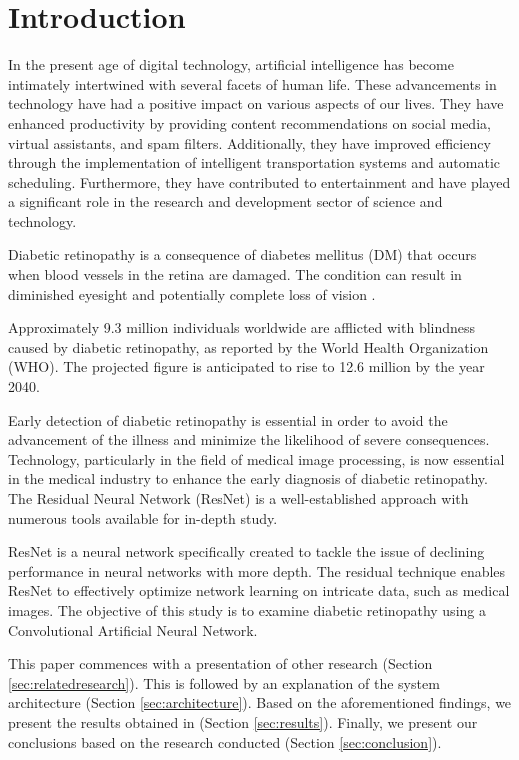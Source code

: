 \section{Introduction}
\label{sec:pendahuluan}


In the present age of digital technology, artificial intelligence has become intimately intertwined with several facets of human life. These advancements in technology have had a positive impact on various aspects of our lives. They have enhanced productivity by providing content recommendations on social media, virtual assistants, and spam filters. Additionally, they have improved efficiency through the implementation of intelligent transportation systems and automatic scheduling. Furthermore, they have contributed to entertainment and have played a significant role in the research and development sector of science and technology.
 
Diabetic retinopathy is a consequence of diabetes mellitus (DM) that occurs when blood vessels in the retina are damaged. The condition can result in diminished eyesight and potentially complete loss of vision \citet{Yusran2022}.

Approximately 9.3 million individuals worldwide are afflicted with blindness caused by diabetic retinopathy, as reported by the World Health Organization (WHO). The projected figure is anticipated to rise to 12.6 million by the year 2040.

Early detection of diabetic retinopathy is essential in order to avoid the advancement of the illness and minimize the likelihood of severe consequences. Technology, particularly in the field of medical image processing, is now essential in the medical industry to enhance the early diagnosis of diabetic retinopathy. The Residual Neural Network (ResNet) is a well-established approach with numerous tools available for in-depth study.

ResNet is a neural network specifically created to tackle the issue of declining performance in neural networks with more depth. The residual technique enables ResNet to effectively optimize network learning on intricate data, such as medical images. The objective of this study is to examine diabetic retinopathy using a Convolutional Artificial Neural Network. 


This paper commences with a presentation of other research (Section \ref{sec:relatedresearch}).
This is followed by an explanation of the system architecture (Section \ref{sec:architecture}).
Based on the aforementioned findings, we present the results obtained in (Section \ref{sec:results}).
Finally, we present our conclusions based on the research conducted (Section \ref{sec:conclusion}).